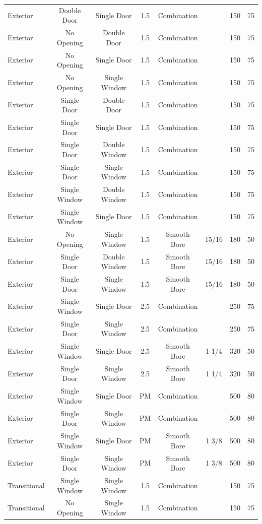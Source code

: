 \documentclass{article}
\begin{document}
\begin{table}[!ht]
\begin{tabular}{lccccccc}
Exterior & Double Door & Single Door & 1.5 & Combination &  & 150 & 75 \\
Exterior & No Opening & Double Door & 1.5 & Combination &  & 150 & 75 \\
Exterior & No Opening & Single Door & 1.5 & Combination &  & 150 & 75 \\
Exterior & No Opening & Single Window & 1.5 & Combination &  & 150 & 75 \\
Exterior & Single Door & Double Door & 1.5 & Combination &  & 150 & 75 \\
Exterior & Single Door & Single Door & 1.5 & Combination &  & 150 & 75 \\
Exterior & Single Door & Double Window & 1.5 & Combination &  & 150 & 75 \\
Exterior & Single Door & Single Window & 1.5 & Combination &  & 150 & 75 \\
Exterior & Single Window & Double Window & 1.5 & Combination &  & 150 & 75 \\
Exterior & Single Window & Single Door & 1.5 & Combination &  & 150 & 75 \\
Exterior & No Opening & Single Window & 1.5 & Smooth Bore & 15/16 & 180 & 50 \\
Exterior & Single Door & Double Window & 1.5 & Smooth Bore & 15/16 & 180 & 50 \\
Exterior & Single Door & Single Window & 1.5 & Smooth Bore & 15/16 & 180 & 50 \\
Exterior & Single Window & Single Door & 2.5 & Combination &  & 250 & 75 \\
Exterior & Single Door & Single Window & 2.5 & Combination &  & 250 & 75 \\
Exterior & Single Window & Single Door & 2.5 & Smooth Bore & 1 1/4 & 320 & 50 \\
Exterior & Single Door & Single Window & 2.5 & Smooth Bore & 1 1/4 & 320 & 50 \\
Exterior & Single Window & Single Door & PM & Combination &  & 500 & 80 \\
Exterior & Single Door & Single Window & PM & Combination &  & 500 & 80 \\
Exterior & Single Window & Single Door & PM & Smooth Bore & 1 3/8 & 500 & 80 \\
Exterior & Single Door & Single Window & PM & Smooth Bore & 1 3/8 & 500 & 80 \\
Transitional & Single Window & Single Window & 1.5 & Combination &  & 150 & 75 \\
Transitional & No Opening & Single Window & 1.5 & Combination &  & 150 & 75 \\

\end{tabular}
\end{table}
\end{document}
